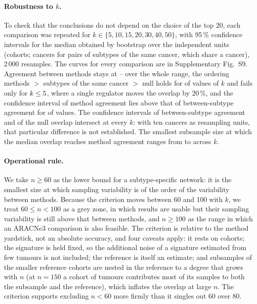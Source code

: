 \documentclass[11pt,a4paper]{article}
\theoremstyle{plain}
\theoremstyle{remark}
\begin{document}
\paragraph{Robustness to $k$.} To check that the conclusions do not depend on the choice of the top 20, each comparison was repeated for
$k\in\{5,10,15,20,30,40,50\}$, with 95\,\% confidence intervals for the median obtained by bootstrap over the independent units
(cohorts; cancers for pairs of subtypes of the same cancer, which share a cancer), 2\,000 resamples. The curves for every comparison are in Supplementary Fig.~S9.
Agreement between methods stays at \Kksweepmethodsmedianmin--\Kksweepmethodsmedianmax{} over the whole range, the ordering methods $>$ subtypes of the same cancer $>$ null
holds for \Kksweepordermediann{} of \Kksweepnk{} values of $k$ and fails only for $k\le5$, where a single regulator moves the overlap by 20\,\%,
and the confidence interval of method agreement lies above that of between-subtype agreement for \Kksweepmethodsciabovesubtypesn{} of \Kksweepnk{} values.
The confidence intervals of between-subtype agreement and of the null overlap intersect at every $k$: with ten cancers as resampling units, that particular difference is not established.
The smallest subsample size at which the median overlap reaches method agreement ranges from \Kksweepminnlowest{} to \Kksweepminnhighest{} across $k$.

\paragraph{Operational rule.} We take $n\ge60$ as the lower bound for a subtype-specific network: it is the smallest size
at which sampling variability is of the order of the variability between methods. Because the criterion moves between 60 and 100
with $k$, we treat $60\le n<100$ as a grey zone, in which results are usable but their sampling variability is still above that between methods, and
$n\ge100$ as the range in which an ARACNe3 comparison is also feasible. The criterion
is relative to the method yardstick, not an absolute accuracy, and four caveats apply: it rests on
\Ksubsamplencohorts{} cohorts; the signature is held fixed, so the additional noise of a
signature estimated from few tumours is not included; the reference is itself an estimate; and subsamples of the smaller reference cohorts are nested in
the reference to a degree that grows with $n$ (at $n=150$ a cohort of \Ksubsamplenfullmin{} tumours contributes most of its samples to both the subsample and the
reference), which inflates the overlap at large $n$. The criterion supports excluding $n<60$ more firmly than it singles out 60 over 80.
\end{document}
